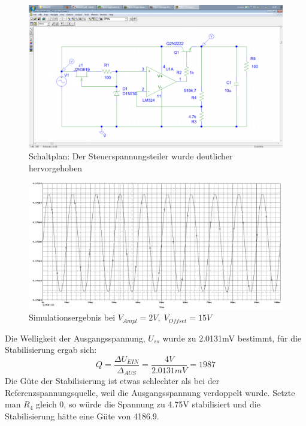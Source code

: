 \begin{figure}[H]
	\centering
	\includegraphics[width=\linewidth]{versuch7/spice/s7411.png}
	\caption{Schaltplan: Der Steuerspannungsteiler wurde deutlicher hervorgehoben}
\end{figure}
\begin{figure}[H]
	\centering
	\includegraphics[width=\linewidth]{versuch7/spice/7411.png}
	\caption{Simulationsergebnis bei $ V_{Ampl} = 2V,\; V_{Offset} = 15V $}
\end{figure}
Die Welligkeit der Ausgangsspannung, $ U_{ss} $ wurde zu 2.0131mV bestimmt, für die Stabilisierung ergab sich:
\[ Q=\frac{\Delta U_{EIN}}{\Delta_{AUS}} = \frac{4V}{2.0131mV}=1987 \]
Die Güte der Stabilisierung ist etwas schlechter als bei der Referenzspannungsquelle, weil die Ausgangsspannung verdoppelt wurde. Setzte man $ R_4 $ gleich 0\Ohm, so würde die Spannung zu 4.75V stabilisiert und die Stabilisierung hätte eine Güte von 4186.9.

